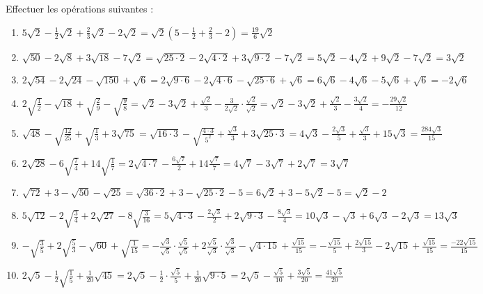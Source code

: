 \begin{solution}
Effectuer les opérations suivantes :
\begin{enumerate}
\item $5\sqrt{2}-\frac{1}{2}\sqrt{2}+\frac{2}{3}\sqrt{2}-2\sqrt{2}=\sqrt{2}\left( 5-\frac{1}{2}+\frac{2}{3}-2 \right)=\frac{19}{6}\sqrt{2}$
\item $\sqrt{50}-2\sqrt{8}+3\sqrt{18}-7\sqrt{2}=\sqrt{25\cdot 2}-2\sqrt{4\cdot 2}+3\sqrt{9\cdot 2}-7\sqrt{2}=5\sqrt{2}-4\sqrt{2}+9\sqrt{2}-7\sqrt{2}=3\sqrt{2}$
\item $2\sqrt{54}-2\sqrt{24}-\sqrt{150}+\sqrt{6}=2\sqrt{9\cdot 6}-2\sqrt{4\cdot 6}-\sqrt{25\cdot 6}+\sqrt{6}=6\sqrt{6}-4\sqrt{6}-5\sqrt{6}+\sqrt{6}=-2\sqrt{6}$
\item $2\sqrt{\frac{1}{2}}-\sqrt{18}+\sqrt{\frac{2}{9}}-\sqrt{\frac{9}{8}}=\sqrt{2}-3\sqrt{2}+\frac{\sqrt{2}}{3}-\frac{3}{2\sqrt{2}}\cdot \frac{\sqrt{2}}{\sqrt{2}}=\sqrt{2}-3\sqrt{2}+\frac{\sqrt{2}}{3}-\frac{3\sqrt{2}}{4}=-\frac{29\sqrt{2}}{12}$
\item $\sqrt{48}-\sqrt{\frac{12}{25}}+\sqrt{\frac{1}{3}}+3\sqrt{75}=\sqrt{16\cdot 3}-\sqrt{\frac{4\cdot 3}{{{5}^{2}}}}+\frac{\sqrt{3}}{3}+3\sqrt{25\cdot 3}=4\sqrt{3}-\frac{2\sqrt{3}}{5}+\frac{\sqrt{3}}{3}+15\sqrt{3}=\frac{284\sqrt{3}}{15}$
\item $2\sqrt{28}-6\sqrt{\frac{7}{4}}+14\sqrt{\frac{1}{7}}=2\sqrt{4\cdot 7}-\frac{6\sqrt{7}}{2}+14\frac{\sqrt{7}}{7}=4\sqrt{7}-3\sqrt{7}+2\sqrt{7}=3\sqrt{7}$
\item $\sqrt{72}+3-\sqrt{50}-\sqrt{25}=\sqrt{36\cdot 2}+3-\sqrt{25\cdot 2}-5=6\sqrt{2}+3-5\sqrt{2}-5=\sqrt{2}-2$
\item $5\sqrt{12}-2\sqrt{\frac{3}{4}}+2\sqrt{27}-8\sqrt{\frac{3}{16}}=5\sqrt{4\cdot 3}-\frac{2\sqrt{3}}{2}+2\sqrt{9\cdot 3}-\frac{8\sqrt{3}}{4}=10\sqrt{3}-\sqrt{3}+6\sqrt{3}-2\sqrt{3}=13\sqrt{3}$
\item $-\sqrt{\frac{3}{5}}+2\sqrt{\frac{5}{3}}-\sqrt{60}+\sqrt{\frac{1}{15}}=-\frac{\sqrt{3}}{\sqrt{5}}\cdot \frac{\sqrt{5}}{\sqrt{5}}+2\frac{\sqrt{5}}{\sqrt{3}}\cdot \frac{\sqrt{3}}{\sqrt{3}}-\sqrt{4\cdot 15}+\frac{\sqrt{15}}{15}=-\frac{\sqrt{15}}{5}+\frac{2\sqrt{15}}{3}-2\sqrt{15}+\frac{\sqrt{15}}{15}=\frac{-22\sqrt{15}}{15}
$
\item $2\sqrt{5}-\frac{1}{2}\sqrt{\frac{1}{5}}+\frac{1}{20}\sqrt{45}=2\sqrt{5}-\frac{1}{2}\cdot \frac{\sqrt{5}}{5}+\frac{1}{20}\sqrt{9\cdot 5}=2\sqrt{5}-\frac{\sqrt{5}}{10}+\frac{3\sqrt{5}}{20}=\frac{41\sqrt{5}}{20}$
\end{enumerate}
\end{solution}

